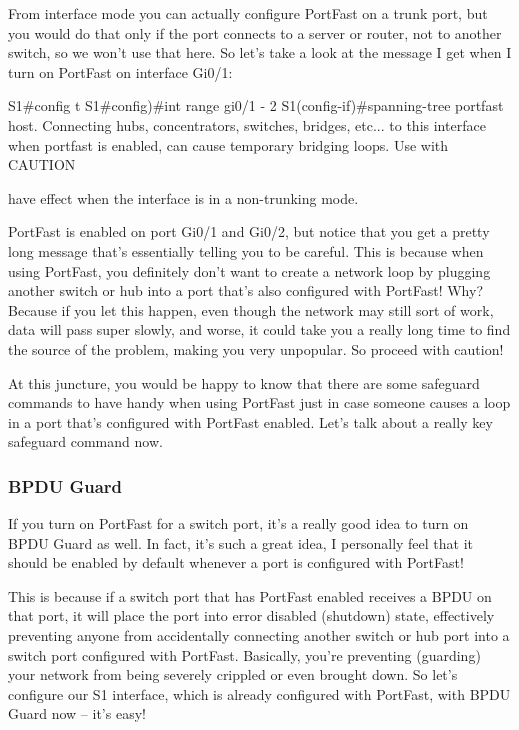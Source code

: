From interface mode you can actually configure PortFast on a trunk port,
but you would do that only if the port connects to a server or router,
not to another switch, so we won't use that here. So let's take a look
at the message I get when I turn on PortFast on interface Gi0/1:

\begin{cli}
S1#config t
S1#config)#int range gi0/1 - 2
S1(config-if)#spanning-tree portfast
 host. Connecting hubs, concentrators, switches, bridges, etc... to this
 interface  when portfast is enabled, can cause temporary bridging loops.
 Use with CAUTION
\end{cli}

\begin{cli}
 
 have effect when the interface is in a non-trunking mode.
\end{cli}

PortFast is enabled on port Gi0/1 and Gi0/2, but notice that you get a
pretty long message that's essentially telling you to be careful. This
is because when using PortFast, you definitely don't want to create a
network loop by plugging another switch or hub into a port that's also
configured with PortFast! Why? Because if you let this happen, even
though the network may still sort of work, data will pass super slowly,
and worse, it could take you a really long time to find the source of
the problem, making you very unpopular. So proceed with caution!

At this juncture, you would be happy to know that there are some
safeguard commands to have handy when using PortFast just in case
someone causes a loop in a port that's configured with PortFast enabled.
Let's talk about a really key safeguard command now.

\subsubsection[BPDU
Guard]{\texorpdfstring{\protect\hypertarget{c15.xhtmlux5cux23c15-sec-18}{}{}BPDU
Guard}{BPDU Guard}}

If you turn on PortFast for a switch port, it's a really good idea to
turn on BPDU Guard as well. In fact, it's such a great idea, I
personally feel that it should be enabled by default whenever a port is
configured with PortFast!

This is because if a switch port that has PortFast enabled receives a
BPDU on that port, it will place the port into error disabled (shutdown)
state, effectively preventing anyone from accidentally connecting
another switch or hub port into a switch port configured with PortFast.
Basically, you're preventing (guarding) your network from being severely
crippled or even brought down. So let's configure our S1 interface,
which is already configured with PortFast, with BPDU Guard now -- it's
easy!

